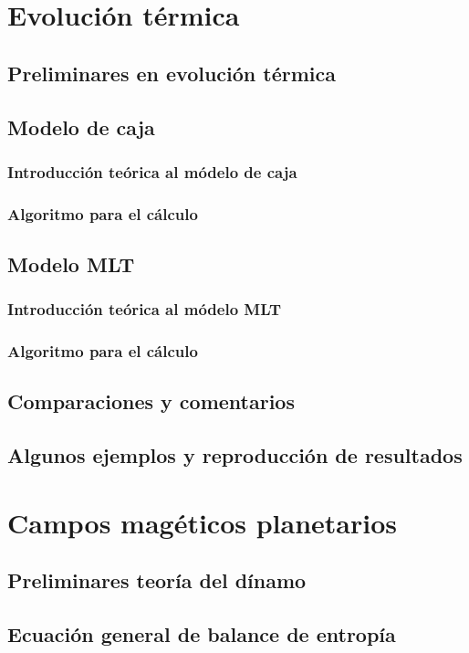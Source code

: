 \documentclass[10pt]{book}
\begin{document}
\chapter{Evolución térmica}
	\section{Preliminares en evolución térmica}
	\section{Modelo de caja}
		\subsection{Introducción teórica al módelo de caja}
		\subsection{Algoritmo para el cálculo}
	\section{Modelo MLT}
		\subsection{Introducción teórica al módelo MLT}
		\subsection{Algoritmo para el cálculo}
	\section{Comparaciones y comentarios}		
	\section{Algunos ejemplos y reproducción de resultados}

\chapter{Campos magéticos planetarios}
	\section{Preliminares teoría del dínamo}
	\section{Ecuación general de balance de entropía}
\end{document}
